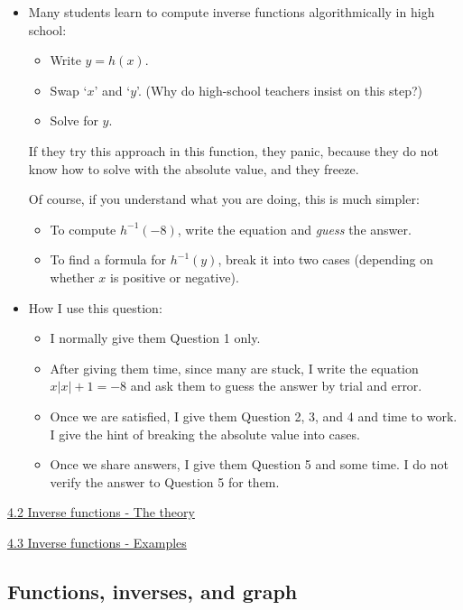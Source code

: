 \documentclass[11pt]{article}
\newcommand {\DS} [1] {${\displaystyle #1}$}
\newcommand{\nl}{\hfill \vspace{-1.1\baselineskip}} %
\newcommand{\vii}{\hspace{8mm} \href{https://www.youtube.com/watch?v=DxecWsEms_c&list=PLlwePzQY_wW-EDeUZebRoA8HGoeZxxpEU&index=2}{4.2 Inverse functions - The theory}}
\newcommand{\viii}{\hspace{8mm} \href{https://www.youtube.com/watch?v=bnsVbyLUZqs&list=PLlwePzQY_wW-EDeUZebRoA8HGoeZxxpEU&index=3}{4.3 Inverse functions - Examples}}
\begin{document}
\begin{comments}
\nl
\begin{itemize}
	\item Many students learn to compute inverse functions algorithmically in high school:
		\begin{itemize}
			\item  Write \DS{y = h(x)}.  
			\item Swap `$x$' and `$y$'.  (Why do high-school teachers insist on this step?)
			\item Solve for $y$.
		\end{itemize}
		If they try this approach in this function, they panic, because they do not know how to solve with the absolute value, and they freeze.
		
		Of course, if you understand what you are doing, this is much simpler:
		\begin{itemize}
			\item  To compute \DS{h^{-1}(-8)}, write the equation and \emph{guess} the answer.
			\item  To find a formula for \DS{h^{-1}(y)}, break it into two cases (depending on whether $x$ is positive or negative).
		\end{itemize}
	\item How I use this question:
		\begin{itemize}
			\item  I normally give them Question 1 only.
			\item  After giving them time, since many are stuck, I write the equation \DS{x|x|+1=-8} and ask them to guess the answer by trial and error.
			\item Once we are satisfied, I give them Question 2, 3, and 4 and time to work.  I give the hint of breaking the absolute value into cases.  
			\item Once we share answers, I give them Question 5 and some time.  I do not verify the answer to Question 5 for them.
		\end{itemize}
\end{itemize}	
\end{comments}

\begin{videos}
\vii

\viii
\end{videos}

\newpage
\subsection{Functions, inverses, and graph} 
\end{document}
